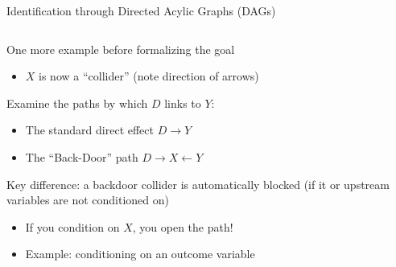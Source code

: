 \documentclass[notes,11pt, aspectratio=169]{beamer}
\newenvironment{wideitemize}{\itemize\addtolength{\itemsep}{10pt}}{\enditemize}
\begin{document}
\begin{frame}{Identification through Directed Acylic Graphs (DAGs)}
\begin{columns}[T] %
  \begin{column}{.6\textwidth}
    \begin{wideitemize}
    \item One more example before formalizing the goal
      \begin{itemize}
      \item $X$ is now a ``collider'' (note direction of arrows)
      \end{itemize}
    \item Examine the paths by which $D$ links to $Y$:
      \begin{itemize}
      \item The standard direct effect $D \rightarrow Y$
      \item The ``Back-Door'' path $D \rightarrow X \leftarrow Y$
      \end{itemize}
    \item Key difference: a backdoor collider is automatically blocked
      (if it or upstream variables are not conditioned on)
      \begin{itemize}
      \item If you condition on $X$, you open the path!
      \item Example: conditioning on an outcome variable
      \end{itemize}
    \end{wideitemize}
  \end{column}%
  \hfill%
  \begin{column}{.5\textwidth}
    \begin{center}
    \end{center}
  \end{column}
\end{columns}
\end{frame}
\end{document}
